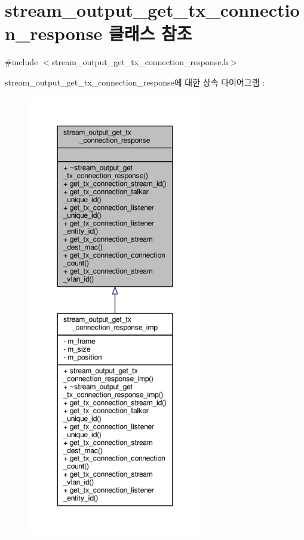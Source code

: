 \hypertarget{classavdecc__lib_1_1stream__output__get__tx__connection__response}{}\section{stream\+\_\+output\+\_\+get\+\_\+tx\+\_\+connection\+\_\+response 클래스 참조}
\label{classavdecc__lib_1_1stream__output__get__tx__connection__response}


{\ttfamily \#include $<$stream\+\_\+output\+\_\+get\+\_\+tx\+\_\+connection\+\_\+response.\+h$>$}



stream\+\_\+output\+\_\+get\+\_\+tx\+\_\+connection\+\_\+response에 대한 상속 다이어그램 \+: 
\nopagebreak
\begin{figure}[H]
\begin{center}
\leavevmode
\includegraphics[height=550pt]{classavdecc__lib_1_1stream__output__get__tx__connection__response__inherit__graph}
\end{center}
\end{figure}



